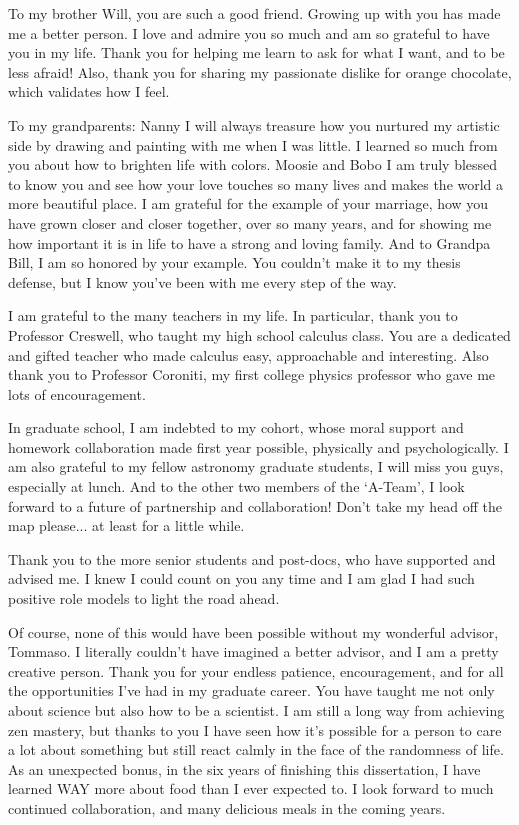 \documentclass[12pt]{ucthesis}
\begin{document}
\begin{frontmatter}
\begin{acknowledgements}
To my brother Will, you are such a good friend. Growing up with you has made me a better person. I love and admire you so much and am so grateful to have you in my life. Thank you for helping me learn to ask for what I want, and to be less afraid! Also, thank you for sharing my passionate dislike for orange chocolate, which validates how I feel.

To my grandparents: Nanny I will always treasure how you nurtured my artistic side by drawing and painting with me when I was little. I learned so much from you about how to brighten life with colors. Moosie and Bobo I am truly blessed to know you and see how your love touches so many lives and makes the world a more beautiful place. I am grateful for the example of your marriage, how you have grown closer and closer together, over so many years, and for showing me how important it is in life to have a strong and loving family. And to Grandpa Bill, I am so honored by your example. You couldn't make it to my thesis defense, but I know you've been with me every step of the way.

I am grateful to the many teachers in my life. In particular, thank you to Professor Creswell, who taught my high school calculus class. You are a dedicated and gifted teacher who made calculus easy, approachable and interesting. Also thank you to Professor Coroniti, my first college physics professor who gave me lots of encouragement.

In graduate school, I am indebted to my cohort, whose moral support and homework collaboration made first year possible, physically and psychologically. I am also grateful to my fellow astronomy graduate students, I will miss you guys, especially at lunch. And to the other two members of the `A-Team', I look forward to a future of partnership and collaboration! Don't take my head off the map please... at least for a little while. 

Thank you to the more senior students and post-docs, who have supported and advised me. I knew I could count on you any time and I am glad I had such positive role models to light the road ahead.

Of course, none of this would have been possible without my wonderful advisor, Tommaso. I literally couldn't have imagined a better advisor, and I am a pretty creative person. Thank you for your endless patience, encouragement, and for all the opportunities I've had in my graduate career. You have taught me not only about science but also how to be a scientist. I am still a long way from achieving zen mastery, but thanks to you I have seen how it's possible for a person to care a lot about something but still react calmly in the face of the randomness of life. As an unexpected bonus, in the six years of finishing this dissertation, I have learned WAY more about food than I ever expected to. I look forward to much continued collaboration, and many delicious meals in the coming years.


\end{acknowledgements}
\end{frontmatter}
\end{document}

